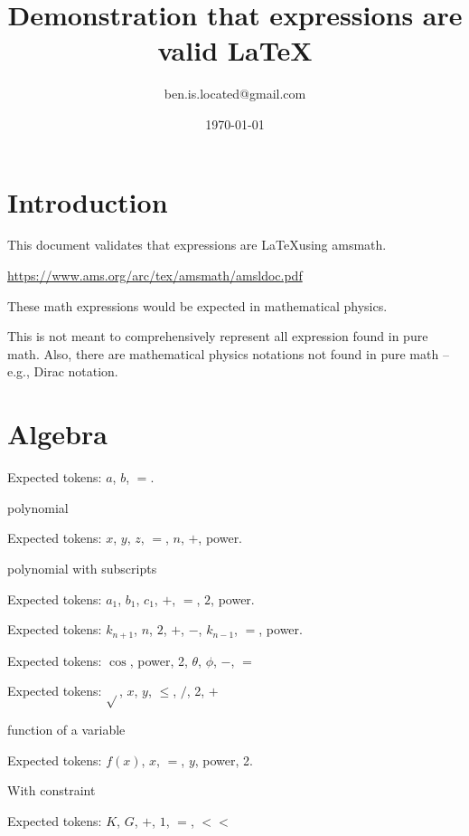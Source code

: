 \documentclass{article}
\title{Demonstration that expressions are valid \LaTeX}
\author{ben.is.located@gmail.com}
\date{\today}
\begin{document}
\maketitle

\section{Introduction}
This document validates that expressions are \LaTeX using amsmath. 

\href{https://www.ams.org/arc/tex/amsmath/amsldoc.pdf}{https://www.ams.org/arc/tex/amsmath/amsldoc.pdf}

These math expressions would be expected in mathematical physics.

This is not meant to comprehensively represent all expression found in pure math. Also, there are mathematical physics notations not found in pure math -- e.g., Dirac notation.

\section{Algebra}

\hrulefill


Expected tokens: $a$, $b$, $=$.

\hrulefill

polynomial
    
Expected tokens: $x$, $y$, $z$, $=$, $n$, $+$, power.

\hrulefill

polynomial with subscripts
    
Expected tokens: $a_1$, $b_1$, $c_1$, $+$, $=$, $2$, power.

\hrulefill


    
Expected tokens: $k_{n+1}$, $n$, $2$, $+$, $-$, $k_{n-1}$, $=$, power.

\hrulefill


    
Expected tokens: $\cos$, power, 2, $\theta$, $\phi$, $-$, $=$

\hrulefill


    
Expected tokens: $\sqrt{}$, $x$, $y$, $\leq$, $/$, 2, $+$

\hrulefill


function of a variable
    
Expected tokens: $f(x)$, $x$, $=$, $y$, power, 2.

\hrulefill


With constraint
    
Expected tokens: $K$, $G$, $+$, $1$, $=$, $<<$
\end{document}
